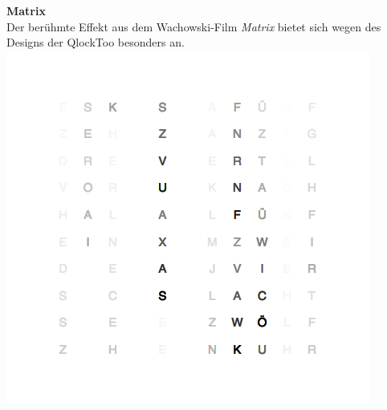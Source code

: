 \begin{multicols}{2}
\textbf{Matrix} \\
Der berühmte Effekt aus dem Wachowski-Film \emph{Matrix} bietet sich wegen des Designs der QlockToo besonders an.
\includegraphics[width=\columnwidth]{Abbildungen/Software/Demo/Matrix}


\end{multicols}

